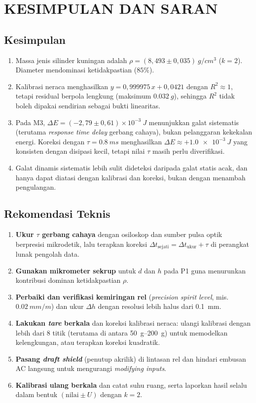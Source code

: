 \documentclass[a4paper, 12pt]{article}
\begin{document}
    \section{KESIMPULAN DAN SARAN}
        \subsection{Kesimpulan}
        \begin{enumerate}
            \item Massa jenis silinder kuningan adalah $\rho=(8{,}493\pm0{,}035)\ \si{g/cm^3}$ ($k=2$). Diameter mendominasi ketidakpastian ($85\%$).
            \item Kalibrasi neraca menghasilkan $y=0{,}999975\,x+0{,}0421$ dengan $R^2\approx 1$, tetapi residual berpola lengkung (maksimum $\SI{0,032}{g}$), sehingga $R^2$ tidak boleh dipakai sendirian sebagai bukti linearitas.
            \item Pada M3, $\Delta E=(-2{,}79\pm0{,}61)\times10^{-3}\ \si{J}$ menunjukkan galat sistematis (terutama \textit{response time delay} gerbang cahaya), bukan pelanggaran kekekalan energi. Koreksi dengan $\tau=\SI{0,8}{ms}$ menghasilkan $\Delta E\approx+\SI{1,0e-3}{J}$ yang konsisten dengan disipasi kecil, tetapi nilai $\tau$ masih perlu diverifikasi.
            \item Galat dinamis sistematis lebih sulit dideteksi daripada galat statis acak, dan hanya dapat diatasi dengan kalibrasi dan koreksi, bukan dengan menambah pengulangan.
        \end{enumerate}

        \subsection{Rekomendasi Teknis}
        \begin{enumerate}
            \item \textbf{Ukur $\tau$ gerbang cahaya} dengan osiloskop dan sumber pulsa optik berpresisi mikrodetik, lalu terapkan koreksi $\Delta t_{\mathrm{sejati}}=\Delta t_{\mathrm{ukur}}+\tau$ di perangkat lunak pengolah data.
            \item \textbf{Gunakan mikrometer sekrup} untuk $d$ dan $h$ pada P1 guna menurunkan kontribusi dominan ketidakpastian $\rho$.
            \item \textbf{Perbaiki dan verifikasi kemiringan rel} (\textit{precision spirit level}, mis. $\SI{0,02}{mm/m}$) dan ukur $\Delta h$ dengan resolusi lebih halus dari \SI{0,1}{mm}.
            \item \textbf{Lakukan \textit{tare} berkala} dan koreksi kalibrasi neraca: ulangi kalibrasi dengan lebih dari $8$ titik (terutama di antara \SIrange{50}{200}{g}) untuk memodelkan kelengkungan, atau terapkan koreksi kuadratik.
            \item \textbf{Pasang \textit{draft shield}} (penutup akrilik) di lintasan rel dan hindari embusan AC langsung untuk mengurangi \textit{modifying inputs}.
            \item \textbf{Kalibrasi ulang berkala} dan catat suhu ruang, serta laporkan hasil selalu dalam bentuk $(\text{nilai}\pm U)$ dengan $k=2$.
        \end{enumerate}
\end{document}
